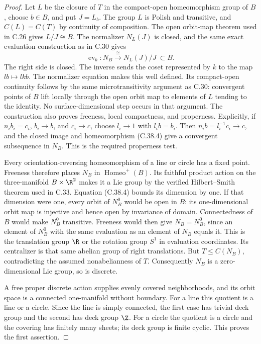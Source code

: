 \begin{proof}
Let $L$ be the closure of $T$ in the compact-open
homeomorphism group of $B$, choose $b\in B$, and put
$J=L_b$. The group $L$ is Polish and transitive, and
$C(L)=C(T)$ by continuity of composition.
The open orbit-map theorem used in C.26 gives
$L/J\cong B$. The normalizer $N_L(J)$ is closed, and
the same exact evaluation construction as in C.30 gives
\[
 \operatorname{ev}_b:N_B
       \xrightarrow{\ \cong\ }N_L(J)/J\ \subset B.
                                                        \tag{C.38.4}
\]
The right side is closed. The inverse sends the coset
represented by $k$ to the map $lb\mapsto lkb$.
The normalizer equation makes this well defined.
Its compact-open continuity follows by the same
microtransitivity argument as C.30: convergent points
of $B$ lift locally through the open orbit map to
elements of $L$ tending to the identity.
No surface-dimensional step occurs in that argument.
The construction also proves freeness, local compactness,
and properness. Explicitly, if
$n_i b_i=c_i$, $b_i\to b$, and $c_i\to c$, choose
$l_i\to1$ with $l_i b=b_i$. Then
$n_i b=l_i^{-1}c_i\to c$, and the closed image and
homeomorphism (C.38.4) give a convergent subsequence
in $N_B$. This is the required properness test.

Every orientation-reversing homeomorphism of a line
or circle has a fixed point. Freeness therefore places
$N_B$ in $\operatorname{Homeo}^+(B)$.
Its faithful product action on the three-manifold
$B\times\R^2$ makes it a Lie group by the verified
Hilbert--Smith theorem used in C.33.
Equation (C.38.4) bounds its dimension by one.
If that dimension were one, every orbit of $N_B^0$
would be open in $B$: its one-dimensional orbit map
is injective and hence open by invariance of domain.
Connectedness of $B$ would make $N_B^0$ transitive.
Freeness would then give $N_B=N_B^0$, since an element
of $N_B^0$ with the same evaluation as an element of
$N_B$ equals it. This is the translation group $\R$
or the rotation group $S^1$ in evaluation coordinates.
Its centralizer is that same abelian group of right
translations. But $T\leq C(N_B)$, contradicting the
assumed nonabelianness of $T$.
Consequently $N_B$ is a zero-dimensional Lie group,
so is discrete.

A free proper discrete action supplies evenly covered
neighborhoods, and its orbit space is a connected
one-manifold without boundary. For a line this
quotient is a line or a circle. Since the line is
simply connected, the first case has trivial deck
group and the second has deck group $\Z$.
For a circle the quotient is a circle and the
covering has finitely many sheets; its deck group
is finite cyclic. This proves the first assertion.


\end{proof}
